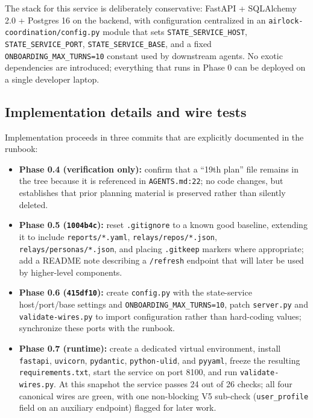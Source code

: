 The stack for this service is deliberately conservative: FastAPI +
SQLAlchemy 2.0 + Postgres 16 on the backend, with configuration
centralized in an \texttt{airlock-coordination/config.py} module that
sets \texttt{STATE\_SERVICE\_HOST}, \texttt{STATE\_SERVICE\_PORT},
\texttt{STATE\_SERVICE\_BASE}, and a fixed
\texttt{ONBOARDING\_MAX\_TURNS=10} constant used by downstream agents.
No exotic dependencies are introduced; everything that runs in Phase 0
can be deployed on a single developer laptop.

\subsection{Implementation details and wire
tests}\label{implementation-details-and-wire-tests}

Implementation proceeds in three commits that are explicitly documented
in the runbook:

\begin{itemize}
\tightlist
\item
  \textbf{Phase 0.4 (verification only):} confirm that a ``19th plan''
  file remains in the tree because it is referenced in
  \texttt{AGENTS.md:22}; no code changes, but establishes that prior
  planning material is preserved rather than silently deleted.
\item
  \textbf{Phase 0.5 (\texttt{1004b4c}):} reset \texttt{.gitignore} to a
  known good baseline, extending it to include \texttt{reports/*.yaml},
  \texttt{relays/repos/*.json}, \texttt{relays/personas/*.json}, and
  placing \texttt{.gitkeep} markers where appropriate; add a README note
  describing a \texttt{/refresh} endpoint that will later be used by
  higher-level components.
\item
  \textbf{Phase 0.6 (\texttt{415df10}):} create \texttt{config.py} with
  the state-service host/port/base settings and
  \texttt{ONBOARDING\_MAX\_TURNS=10}, patch \texttt{server.py} and
  \texttt{validate-wires.py} to import configuration rather than
  hard-coding values; synchronize these ports with the runbook.
\item
  \textbf{Phase 0.7 (runtime):} create a dedicated virtual environment,
  install \texttt{fastapi}, \texttt{uvicorn}, \texttt{pydantic},
  \texttt{python-ulid}, and \texttt{pyyaml}, freeze the resulting
  \texttt{requirements.txt}, start the service on port 8100, and run
  \texttt{validate-wires.py}. At this snapshot the service passes 24 out
  of 26 checks; all four canonical wires are green, with one
  non-blocking V5 sub-check (\texttt{user\_profile} field on an
  auxiliary endpoint) flagged for later work.
\end{itemize}

